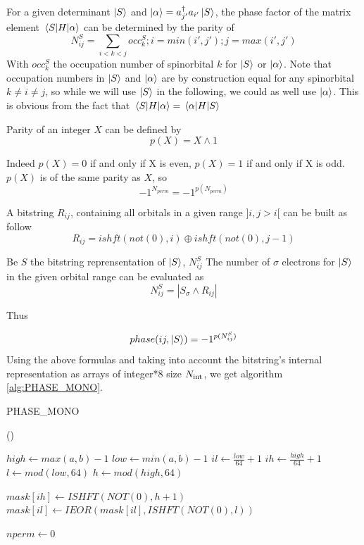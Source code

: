 
For a given determinant $\ket S$ and $\ket{\alpha}=a^\dagger_{j'} a_{i'}  \ket S$, the phase factor of the matrix element $\mel{S}{H}{\alpha}$ can be determined by the parity of
$$N^{S}_{ij}=\sum_{i<k<j} occ^{S}_{k};i=min(i',j');j=max(i',j')$$
With $occ^{S}_{k}$ the occupation number of spinorbital $k$ for $\ket S$ or $\ket \alpha$. Note that occupation numbers in $\ket S$ and $\ket \alpha$ are by construction equal for any spinorbital $k \neq i \neq j$, so while we will use $\ket S$ in the following, we could as well use $\ket \alpha$. This is obvious from the fact that $\mel{S}{H}{\alpha}=\mel{\alpha}{H}{S}$  

Parity of an integer $X$ can be defined by $$p(X)=X \wedge 1$$
        
Indeed $p(X)=0$ if and only if X is even, $p(X)=1$ if and only if X is odd. $p(X)$ is of the same parity as $X$, so 
$$-1^{N_{perm}} = -1^{p(N_{perm})}$$
        
        

A bitstring $R_{ij}$, containing all orbitals in a given range $]i, j>i[$ can be built as follow
$$R_{ij}=ishft(not(0),i) \oplus ishft(not(0),j-1)$$


Be $S$ the bitstring reprensentation of $\ket S$, $N^{S}_{ij}$ The number of $\sigma$ electrons for $\ket S$ in the given orbital range can be evaluated as
$$N^{S}_{ij} = |S_\sigma \wedge R_{ij}|$$

Thus 

$$phase(ij, \ket S) = -1^{p(N^S_{ij})}$$
Using the above formulas and taking into account the bitstring's internal representation as arrays of integer*8 size ${N_\text{int}}$, we get algorithm \ref{alg:PHASE_MONO}.   


\begin{algorithm}
	\caption{PHASE\_MONO}	
	\label{alg:PHASE_MONO}
	
	\Fn(){}{
		$high \gets max(a,b)-1$ \;
		$low \gets min(a,b)-1$ \;
		$il \gets \frac{low}{64} + 1$ \;
		$ih \gets \frac{high}{64} + 1$ \;
		$l \gets mod(low, 64)$ \;
		$h \gets mod(high, 64)$ \; 

		
		$mask[ih] \gets ISHFT(NOT(0), h+1)$ \;
		$mask[il] \gets IEOR(mask[il], ISHFT(NOT(0), l))$ \;
		
		
		$nperm \gets 0$ \;
		}
\end{algorithm}
        

